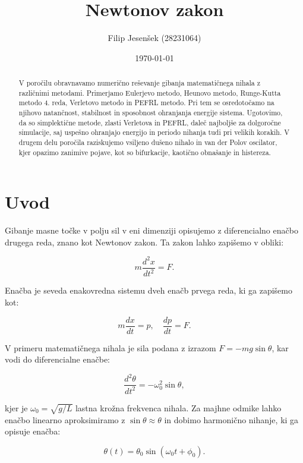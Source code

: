 \documentclass[12pt,a4paper]{article}
\title{Newtonov zakon}
\author{Filip Jesenšek (28231064)}
\date{\today}
\begin{document}
\maketitle

\begin{abstract}
V poročilu obravnavamo numerično reševanje gibanja matematičnega nihala z različnimi metodami. Primerjamo Eulerjevo metodo, Heunovo metodo, Runge-Kutta metodo 4. reda, Verletovo metodo in PEFRL metodo. Pri tem se osredotočamo na njihovo natančnost, stabilnost in sposobnost ohranjanja energije sistema. Ugotovimo, da so simplektične metode, zlasti Verletova in PEFRL, daleč najboljše za dolgoročne simulacije, saj uspešno ohranjajo energijo in periodo nihanja tudi pri velikih korakih. V drugem delu poročila raziskujemo vsiljeno dušeno nihalo in van der Polov oscilator, kjer opazimo zanimive pojave, kot so bifurkacije, kaotično obnašanje in histereza.
\end{abstract}

\section{Uvod}

Gibanje masne točke v polju sil v eni dimenziji opisujemo z diferencialno enačbo drugega reda, znano kot Newtonov zakon. Ta zakon lahko zapišemo v obliki:

\begin{equation}
m \frac{d^2x}{dt^2} = F.
\end{equation}

Enačba je seveda enakovredna sistemu dveh enačb prvega reda, ki ga zapišemo kot:

\begin{equation}
m \frac{dx}{dt} = p, \quad \frac{dp}{dt} = F.
\end{equation}

V primeru matematičnega nihala je sila podana z izrazom $F = -mg\sin\theta$, kar vodi do diferencialne enačbe:

\begin{equation}
\frac{d^2\theta}{dt^2} = -\omega_0^2 \sin\theta,
\end{equation}

kjer je $\omega_0 = \sqrt{g/L}$ lastna krožna frekvenca nihala. Za majhne odmike lahko enačbo linearno aproksimiramo z $\sin\theta \approx \theta$ in dobimo harmonično nihanje, ki ga opisuje enačba:

\begin{equation}
\theta(t) = \theta_0 \sin(\omega_0 t + \phi_0).
\end{equation}
\end{document}
